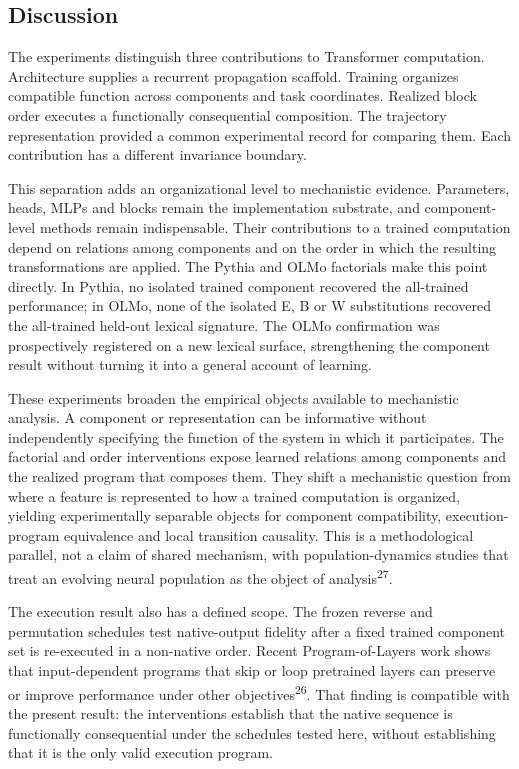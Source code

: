 \documentclass[12pt]{article}
\begin{document}
\subsection*{Discussion}

The experiments distinguish three contributions to Transformer computation. Architecture supplies a recurrent propagation scaffold. Training organizes compatible function across components and task coordinates. Realized block order executes a functionally consequential composition. The trajectory representation provided a common experimental record for comparing them. Each contribution has a different invariance boundary.

This separation adds an organizational level to mechanistic evidence. Parameters, heads, MLPs and blocks remain the implementation substrate, and component-level methods remain indispensable. Their contributions to a trained computation depend on relations among components and on the order in which the resulting transformations are applied. The Pythia and OLMo factorials make this point directly. In Pythia, no isolated trained component recovered the all-trained performance; in OLMo, none of the isolated E, B or W substitutions recovered the all-trained held-out lexical signature. The OLMo confirmation was prospectively registered on a new lexical surface, strengthening the component result without turning it into a general account of learning.

These experiments broaden the empirical objects available to mechanistic analysis. A component or representation can be informative without independently specifying the function of the system in which it participates. The factorial and order interventions expose learned relations among components and the realized program that composes them. They shift a mechanistic question from where a feature is represented to how a trained computation is organized, yielding experimentally separable objects for component compatibility, execution-program equivalence and local transition causality. This is a methodological parallel, not a claim of shared mechanism, with population-dynamics studies that treat an evolving neural population as the object of analysis\textsuperscript{27}.

The execution result also has a defined scope. The frozen reverse and permutation schedules test native-output fidelity after a fixed trained component set is re-executed in a non-native order. Recent Program-of-Layers work shows that input-dependent programs that skip or loop pretrained layers can preserve or improve performance under other objectives\textsuperscript{26}. That finding is compatible with the present result: the interventions establish that the native sequence is functionally consequential under the schedules tested here, without establishing that it is the only valid execution program.
\end{document}
